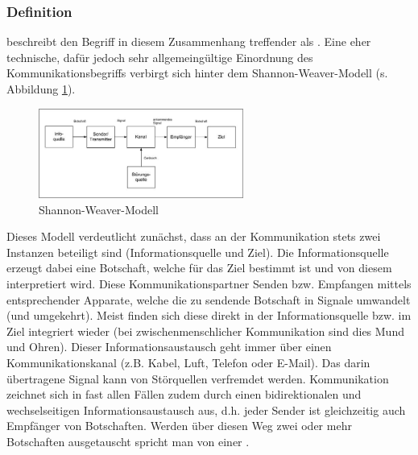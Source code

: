 \subsubsection{Definition}
\citep{duden} beschreibt den Begriff in diesem Zusammenhang  treffender als .
Eine eher technische, dafür jedoch sehr allgemeingültige Einordnung des Kommunikationsbegriffs verbirgt sich hinter dem Shannon-Weaver-Modell (s. Abbildung \ref{fig:shannon-weaver-modell}).

\begin{figure}[htbp]
	\centering
	\includegraphics[width=0.6\textwidth]{abb/shannon-weaver-modell.jpg}
	\caption{Shannon-Weaver-Modell}
	\label{fig:shannon-weaver-modell}
\end{figure}

Dieses Modell verdeutlicht zunächst, dass an der Kommunikation stets zwei Instanzen beteiligt sind (Informationsquelle und Ziel).
Die Informationsquelle erzeugt dabei eine Botschaft, welche für das Ziel bestimmt ist und von diesem interpretiert wird.
Diese Kommunikationspartner Senden bzw. Empfangen mittels entsprechender Apparate, welche die zu sendende Botschaft in Signale umwandelt (und umgekehrt).
Meist finden sich diese  direkt in der Informationsquelle bzw. im Ziel integriert wieder (bei zwischenmenschlicher Kommunikation sind dies Mund und Ohren).
Dieser Informationsaustausch geht immer über einen Kommunikationskanal (z.B. Kabel, Luft, Telefon oder E-Mail). Das darin übertragene Signal kann von Störquellen verfremdet werden.
Kommunikation zeichnet sich in fast allen Fällen zudem durch einen bidirektionalen und wechselseitigen Informationsaustausch aus, d.h. jeder Sender ist gleichzeitig auch Empfänger von Botschaften.
Werden über diesen Weg zwei oder mehr Botschaften ausgetauscht spricht man von einer  \citep{human-hacking}.

